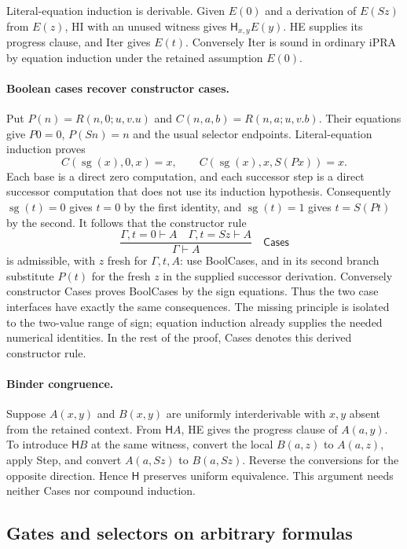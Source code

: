 \documentclass[11pt,letterpaper]{article}
\theoremstyle{definition}\newtheorem{definition}[theorem]{Definition}
\theoremstyle{remark}\newtheorem{remark}[theorem]{Remark}
\begin{document}
Literal-equation induction is derivable.  Given $E(0)$ and a derivation
of $E(Sz)$ from $E(z)$, HI with an unused witness gives
$\mathsf H_{x,y}E(y)$.  HE supplies its progress clause, and Iter
gives $E(t)$.  Conversely Iter is sound in ordinary iPRA by equation
induction under the retained assumption $E(0)$.

\paragraph{Boolean cases recover constructor cases.}
Put $P(n)=R(n,0;u,v.u)$ and $C(n,a,b)=R(n,a;u,v.b)$.
Their equations give $P0=0$, $P(Sn)=n$ and the usual selector
endpoints.  Literal-equation induction proves
\[
 C(\operatorname{sg}(x),0,x)=x,\qquad
 C(\operatorname{sg}(x),x,S(Px))=x.
 \tag{Boolean coverage identities}
\]
Each base is a direct zero computation, and each successor step is a
direct successor computation that does not use its induction hypothesis.
Consequently $\operatorname{sg}(t)=0$ gives $t=0$ by the first
identity, and $\operatorname{sg}(t)=1$ gives $t=S(Pt)$ by the second.
It follows that the constructor rule
\[
 \frac{\Gamma,t=0\vdash A\quad\Gamma,t=Sz\vdash A}
      {\Gamma\vdash A}
 \quad\mathsf{Cases}
\]
is admissible, with $z$ fresh for $\Gamma,t,A$: use BoolCases, and
in its second branch substitute $P(t)$ for the fresh $z$ in the
supplied successor derivation.  Conversely constructor Cases proves
BoolCases by the sign equations.  Thus the two case interfaces have
exactly the same consequences.  The missing principle is isolated to
the two-value range of sign; equation induction already supplies the
needed numerical identities.  In the rest of the proof, Cases denotes
this derived constructor rule.

\paragraph{Binder congruence.}
Suppose $A(x,y)$ and $B(x,y)$ are uniformly interderivable with
$x,y$ absent from the retained context.  From $\mathsf H A$, HE gives
the progress clause of $A(a,y)$.  To introduce $\mathsf H B$ at
the same witness, convert the local $B(a,z)$ to $A(a,z)$, apply Step,
and convert $A(a,Sz)$ to $B(a,Sz)$.  Reverse the conversions for the
opposite direction.  Hence $\mathsf H$ preserves uniform equivalence.
This argument needs neither Cases nor compound induction.

\subsection{Gates and selectors on arbitrary formulas}
\end{document}

